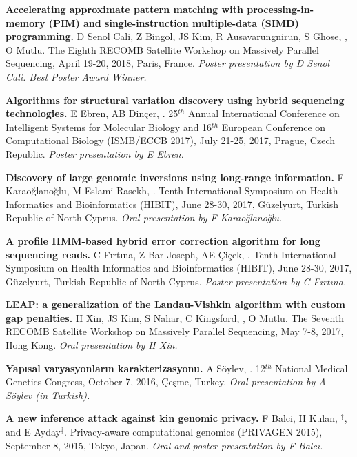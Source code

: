 \vspace{-.2cm}
       {\bf Accelerating approximate pattern matching with processing-in-memory (PIM) and single-instruction multiple-data (SIMD) programming.}
       D Senol Cali, Z Bingol, JS Kim, R Ausavarungnirun, S Ghose, \calkan{},
       O Mutlu.
       The Eighth RECOMB Satellite Workshop on Massively Parallel Sequencing, April 19-20, 2018,
       Paris, France.
       {\it Poster presentation by D Senol Cali. Best Poster Award Winner.}

\vspace{-.2cm}
       {\bf Algorithms for structural variation discovery using hybrid sequencing technologies.}
       E Ebren, AB Dinçer, \calkan{}.
       25$^{th}$ Annual International Conference on Intelligent Systems for Molecular Biology and 16$^{th}$ European Conference on 
       Computational Biology  (ISMB/ECCB 2017), 
       July 21-25, 2017, Prague, Czech Republic.
       {\it Poster presentation by E Ebren.}


\vspace{-.2cm}
       {\bf Discovery of large genomic inversions using long-range information.} F Karaoğlanoğlu, M Eslami Rasekh, \calkan{}.
       Tenth International Symposium on Health Informatics and Bioinformatics (HIBIT), June 28-30, 2017, Güzelyurt, Turkish Republic of North Cyprus.
       {\it Oral presentation by F Karaoğlanoğlu.}

\vspace{-.2cm}
       {\bf A profile HMM-based hybrid error correction algorithm for long sequencing reads.} C Fırtına, Z Bar-Joseph, AE Çiçek, \calkan{}.
       Tenth International Symposium on Health Informatics and Bioinformatics (HIBIT), June 28-30, 2017, Güzelyurt, Turkish Republic of North Cyprus.
       {\it Poster presentation by C Fırtına.}

\vspace{-.2cm}
       {\bf LEAP: a generalization of the Landau-Vishkin algorithm with custom gap penalties.} H Xin, JS Kim, S Nahar, C Kingsford, \calkan{}, O Mutlu.
       The Seventh RECOMB Satellite Workshop on Massively Parallel Sequencing, May 7-8, 2017, Hong Kong.
       {\it Oral presentation by H Xin.}

\vspace{-.2cm}
       {\bf Yapısal varyasyonların karakterizasyonu.} A Söylev, \calkan{}. 12$^{th}$ National Medical Genetics Congress, October 7, 2016, Çeşme, Turkey.
       {\it Oral presentation by A Söylev (in Turkish).}
       
\vspace{-.2cm}
{\bf  A new inference attack against kin genomic privacy.}
F Balci, H Kulan, \calkan{}$^\ddag$, and E Ayday$^\ddag$. 
 Privacy-aware computational genomics (PRIVAGEN 2015), 
 September 8, 2015, Tokyo, Japan. {\it Oral and poster presentation by F Balcı.}

